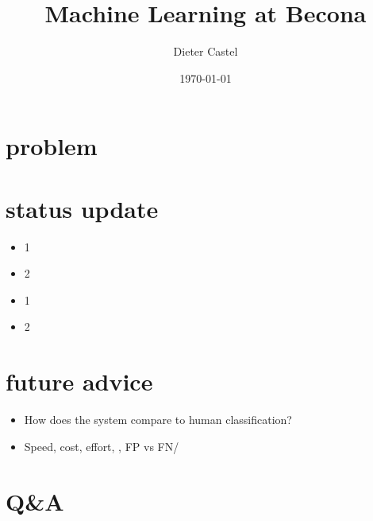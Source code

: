 \documentclass{beamer}
\title{Machine Learning at Becona}
\author{Dieter Castel}
\date{\today}
\begin{document}
\begin{frame}
  \titlepage
\end{frame}

\section{problem}
\section{status update}

\begin{frame}
  \begin{itemize}
	    \item 1
            \item 2
  \end{itemize}

\end{frame}


\begin{frame}
  \begin{itemize}
	    \item 1
            \item 2
  \end{itemize}

\end{frame}
\section{future advice}
\begin{frame}
  \begin{itemize}
	    \item How does the system compare to human classification?
	    \item Speed, cost, effort, , FP vs FN/
  \end{itemize}

\end{frame}
\section{Q&A}
\end{document}
